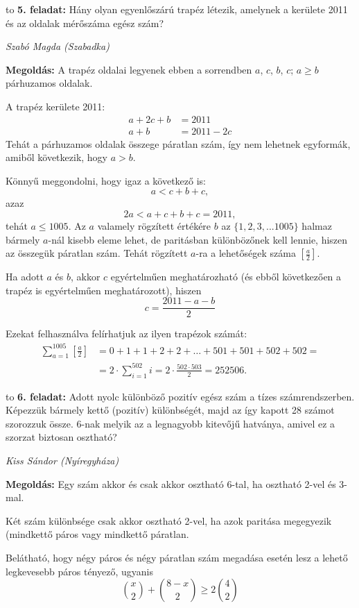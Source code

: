 \documentclass[a4paper,10pt]{article}
\newcommand{\ki}[2]{\hfill {\it #1 (#2)}\medskip}
\newcommand{\vonal}{\hbox to \hsize{\hskip2truecm\hrulefill\hskip2truecm}}
\begin{document}
\medskip


\vonal
{\bf 5. feladat: } 
Hány olyan egyenlőszárú trapéz létezik, amelynek a kerülete 2011 és az oldalak mérőszáma egész szám?

\ki{Szabó Magda}{Szabadka}\medskip

{\bf Megoldás: } 
A trapéz oldalai legyenek ebben a sorrendben $a$, $c$, $b$, $c$; $a\ge b$ párhuzamos oldalak.

A trapéz kerülete 2011:
\begin{align*}
a+2c+b &= 2011\\
a+b&=2011-2c
\end{align*}
Tehát a párhuzamos oldalak összege páratlan szám, így nem lehetnek egyformák, amiből következik, hogy $a>b$.

Könnyű meggondolni, hogy igaz a következő is:
\[a<c+b+c,\]
azaz
\[2a<a+c+b+c=2011,\]
tehát $a\le1005$. Az $a$ valamely rögzített értékére $b$ az $\{1,2,3,...1005\}$ halmaz bármely $a$-nál kisebb eleme lehet, de paritásban különbözőnek kell lennie, hiszen az összegük páratlan szám. Tehát rögzített $a$-ra a lehetőségek száma $\left[\frac a 2\right]$.

Ha adott $a$ és $b$, akkor $c$ egyértelműen meghatározható (és ebből következően a trapéz is egyértelműen meghatározott), hiszen
\[c=\frac{2011-a-b}{2}\]

Ezekat felhasználva felírhatjuk az ilyen trapézok számát:
\begin{align*}
\sum_{a=1}^{1005} \left[\frac a 2\right]&=0+1+1+2+2+\ldots+501+501+502+502=\\
&= 2\cdot \sum_{i=1}^{502} i = 2\cdot\frac{502\cdot503}{2}=252506.
\end{align*}

\medskip


\vonal
{\bf 6. feladat: } 
Adott nyolc különböző pozitív egész szám a tízes számrendszerben. Képezzük bármely kettő (pozitív) különbségét, majd az így kapott 28 számot szorozzuk össze. 6-nak melyik az a legnagyobb kitevőjű hatványa, amivel ez a szorzat biztosan osztható?

\ki{Kiss Sándor}{Nyíregyháza}\medskip

{\bf Megoldás: } 
Egy szám akkor és csak akkor osztható 6-tal, ha osztható 2-vel és 3-mal.

Két szám különbsége csak akkor osztható 2-vel, ha azok paritása megegyezik (mindkettő páros vagy mindkettő páratlan.

Belátható, hogy négy páros és négy páratlan szám megadása esetén lesz a lehető legkevesebb páros tényező, ugyanis
\[\binom{x}{2}+\binom{8-x}{2}\ge2\binom{4}{2}\]
\end{document}
